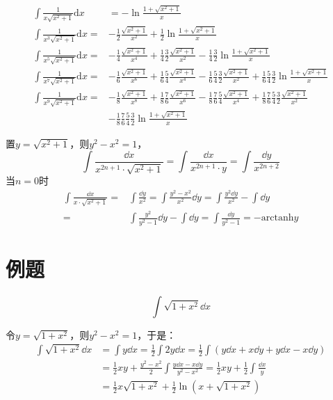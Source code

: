 \begin{theorem}[平方和根式倒数型]
    \vspace{-15pt}
    \begin{align*}
        \int\frac{1}{x\sqrt{x^2+1}}\mathrm{d}x&=-\ln\frac{1+\sqrt{x^{2}+1}}{x}\\
        \int\frac{1}{x^3\sqrt{x^2+1}}\mathrm{d}x=&-\frac{1}{2}\frac{\sqrt{x^2+1}}{x^2}+\frac{1}{2}\ln\frac{1+\sqrt{x^2+1}}{x}\\
        \int\frac{1}{x^{5}\sqrt{x^{2}+1}}\mathrm{d}x=&-\frac{1}{4}\frac{\sqrt{x^2+1}}{x^4}+\frac{1}{4}\frac{3}{2}\frac{\sqrt{x^2+1}}{x^2}-\frac{1}{4}\frac{3}{2}\ln\frac{1+\sqrt{x^2+1}}{x}\\
        \int\frac{1}{x^7\sqrt{x^2+1}}\mathrm{d}x=&-\frac{1}{6}\frac{\sqrt{x^2+1}}{x^6}+\frac{1}{6}\frac{5}{4}\frac{\sqrt{x^2+1}}{x^4}-\frac{1}{6}\frac{5}{4}\frac{3}{2}\frac{\sqrt{x^2+1}}{x^2}+\frac{1}{6}\frac{5}{4}\frac{3}{2}\ln\frac{1+\sqrt{x^2+1}}{x}\\
        \int\frac{1}{x^{9}\sqrt{x^{2}+1}}\mathrm{d}x=&-\frac{1}{8}\frac{\sqrt{x^{2}+1}}{x^{8}}+\frac{1}{8}\frac{7}{6}\frac{\sqrt{x^{2}+1}}{x^{6}}-\frac{1}{8}\frac{7}{6}\frac{5}{4}\frac{\sqrt{x^{2}+1}}{x^{4}}+\frac{1}{8}\frac{7}{6}\frac{5}{4}\frac{3}{2}\frac{\sqrt{x^{2}+1}}{x^{2}}\\
        &-\frac{1}{8}\frac{7}{6}\frac{5}{4}\frac{3}{2}\ln\frac{1+\sqrt{x^{2}+1}}{x}
    \end{align*}
\end{theorem}
置$y=\sqrt{x^{2}+1}$，则$y^{2}-x^{2}=1$，
\[\int\frac{\dd x}{x^{2n+1}\cdot\sqrt{x^{2}+1}}=\int\frac{\dd x}{x^{2n+1}\cdot y}=\int\frac{\dd y}{x^{2n+2}}\]
当$n=0$时
\begin{align*}
\int\frac{\dd x}{x\cdot\sqrt{x^{2}+1}}=&\int\frac{\dd y}{x^{2}}=\int\frac{y^{2}-x^{2}}{x^{2}}\dd y=\int\frac{y^{2}\dd y}{x^{2}}-\int \dd y\\=&\int\frac{y^{2}}{y^{2}-1}\dd y-\int \dd y=\int\frac{\dd y}{y^{2}-1}=-\text{arctanh} y
\end{align*}

\section{例题}
\begin{example}
\[\int \sqrt{1 + x^2} \dd x\]
\end{example}
\begin{solution}
令$y=\sqrt{1+x^2}$，则$y^2-x^2=1$，于是：
\begin{align*}
\int \sqrt{1 + x^2} \dd x &= \int y\dd x=\frac12\int 2y\dd x=\frac12\int(y\dd x+x\dd y+y\dd x-x\dd y)\\
&=\frac12xy+\frac{y^2-x^2}2\int\frac{y\dd x-x\dd y}{y^2-x^2} =\frac12xy+\frac{1}2\int\frac{\dd x}{y}\\
&=\frac12x\sqrt{1+x^2}+\frac12\ln(x+\sqrt{1+x^2})
\end{align*}
\end{solution}

